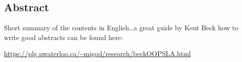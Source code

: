 \begingroup
\let\clearpage\relax
\let\cleardoublepage\relax
\let\cleardoublepage\relax

\begin{otherlanguage}{american}
	\chapter*{Abstract}
	Short summary of the contents in English\dots a great guide by
	Kent Beck how to write good abstracts can be found here:
	\begin{center}
		\url{https://plg.uwaterloo.ca/~migod/research/beckOOPSLA.html}
	\end{center}
\end{otherlanguage}

\newpage
\cleardoublepage


\endgroup

\vfill
